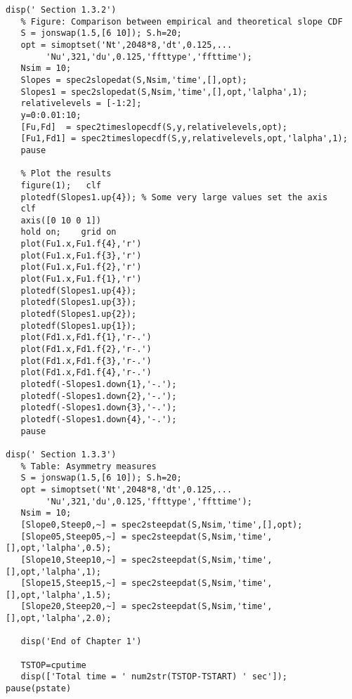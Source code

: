 {\begin{verbatim}
disp(' Section 1.3.2')
   % Figure: Comparison between empirical and theoretical slope CDF
   S = jonswap(1.5,[6 10]); S.h=20;
   opt = simoptset('Nt',2048*8,'dt',0.125,...
        'Nu',321,'du',0.125,'ffttype','ffttime');
   Nsim = 10;
   Slopes = spec2slopedat(S,Nsim,'time',[],opt);
   Slopes1 = spec2slopedat(S,Nsim,'time',[],opt,'lalpha',1);
   relativelevels = [-1:2];
   y=0:0.01:10;
   [Fu,Fd]  = spec2timeslopecdf(S,y,relativelevels,opt);
   [Fu1,Fd1] = spec2timeslopecdf(S,y,relativelevels,opt,'lalpha',1);
   pause
   
   % Plot the results
   figure(1);   clf
   plotedf(Slopes1.up{4}); % Some very large values set the axis
   clf
   axis([0 10 0 1])
   hold on;    grid on
   plot(Fu1.x,Fu1.f{4},'r')
   plot(Fu1.x,Fu1.f{3},'r')
   plot(Fu1.x,Fu1.f{2},'r')
   plot(Fu1.x,Fu1.f{1},'r')
   plotedf(Slopes1.up{4});
   plotedf(Slopes1.up{3});
   plotedf(Slopes1.up{2});
   plotedf(Slopes1.up{1});  
   plot(Fd1.x,Fd1.f{1},'r-.')
   plot(Fd1.x,Fd1.f{2},'r-.')
   plot(Fd1.x,Fd1.f{3},'r-.')
   plot(Fd1.x,Fd1.f{4},'r-.')
   plotedf(-Slopes1.down{1},'-.');
   plotedf(-Slopes1.down{2},'-.');
   plotedf(-Slopes1.down{3},'-.');
   plotedf(-Slopes1.down{4},'-.');
   pause
   
disp(' Section 1.3.3')
   % Table: Asymmetry measures
   S = jonswap(1.5,[6 10]); S.h=20;
   opt = simoptset('Nt',2048*8,'dt',0.125,...
        'Nu',321,'du',0.125,'ffttype','ffttime');
   Nsim = 10;
   [Slope0,Steep0,~] = spec2steepdat(S,Nsim,'time',[],opt);
   [Slope05,Steep05,~] = spec2steepdat(S,Nsim,'time',[],opt,'lalpha',0.5);
   [Slope10,Steep10,~] = spec2steepdat(S,Nsim,'time',[],opt,'lalpha',1);
   [Slope15,Steep15,~] = spec2steepdat(S,Nsim,'time',[],opt,'lalpha',1.5);
   [Slope20,Steep20,~] = spec2steepdat(S,Nsim,'time',[],opt,'lalpha',2.0);

   disp('End of Chapter 1')
   
   TSTOP=cputime
   disp(['Total time = ' num2str(TSTOP-TSTART) ' sec']);
pause(pstate)
\end{verbatim}
}

\newpage
